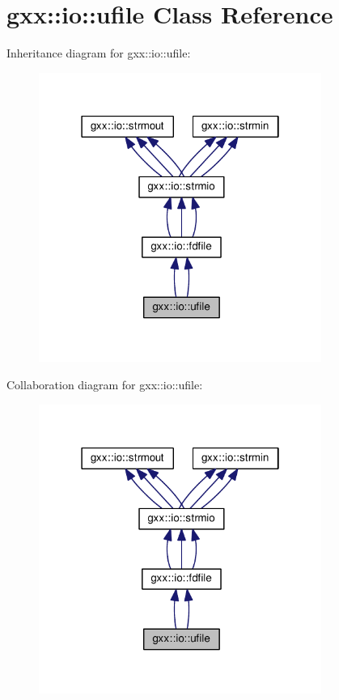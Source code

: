 \hypertarget{classgxx_1_1io_1_1ufile}{}\section{gxx\+:\+:io\+:\+:ufile Class Reference}
\label{classgxx_1_1io_1_1ufile}


Inheritance diagram for gxx\+:\+:io\+:\+:ufile\+:
\nopagebreak
\begin{figure}[H]
\begin{center}
\leavevmode
\includegraphics[width=262pt]{classgxx_1_1io_1_1ufile__inherit__graph}
\end{center}
\end{figure}


Collaboration diagram for gxx\+:\+:io\+:\+:ufile\+:
\nopagebreak
\begin{figure}[H]
\begin{center}
\leavevmode
\includegraphics[width=262pt]{classgxx_1_1io_1_1ufile__coll__graph}
\end{center}
\end{figure}
